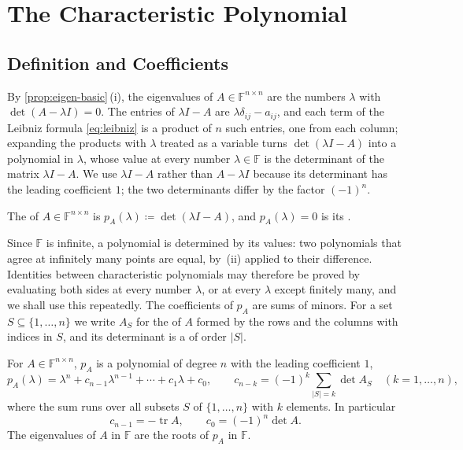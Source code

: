 \section{The Characteristic Polynomial}
\label{sec:characteristic-polynomial}

\subsection{Definition and Coefficients}

By \cref{prop:eigen-basic}\,(i), the eigenvalues of $A\in\mathbb F^{n\times n}$ are the numbers $\lambda$ with $\det(A-\lambda I)=0$. The entries of $\lambda I-A$ are $\lambda\delta_{ij}-a_{ij}$, and each term of the Leibniz formula \eqref{eq:leibniz} is a product of $n$ such entries, one from each column; expanding the products with $\lambda$ treated as a variable turns $\det(\lambda I-A)$ into a polynomial in $\lambda$, whose value at every number $\lambda\in\mathbb F$ is the determinant of the matrix $\lambda I-A$. We use $\lambda I-A$ rather than $A-\lambda I$ because its determinant has the leading coefficient $1$; the two determinants differ by the factor $(-1)^n$.

\begin{definition}
\label{def:characteristic-polynomial}
The  of $A\in\mathbb F^{n\times n}$ is $p_A(\lambda)\coloneqq\det(\lambda I-A)$, and $p_A(\lambda)=0$ is its .
\end{definition}

Since $\mathbb F$ is infinite, a polynomial is determined by its values: two polynomials that agree at infinitely many points are equal, by \,(ii) applied to their difference. Identities between characteristic polynomials may therefore be proved by evaluating both sides at every number $\lambda$, or at every $\lambda$ except finitely many, and we shall use this repeatedly. The coefficients of $p_A$ are sums of minors. For a set $S\subseteq\{1,\ldots,n\}$ we write $A_S$ for the  of $A$ formed by the rows and the columns with indices in $S$, and its determinant is a  of order $|S|$.

\begin{theorem}
\label{thm:charpoly-coefficients}
For $A\in\mathbb F^{n\times n}$, $p_A$ is a polynomial of degree $n$ with the leading coefficient $1$,
\[
p_A(\lambda)=\lambda^n+c_{n-1}\lambda^{n-1}+\cdots+c_1\lambda+c_0,\qquad c_{n-k}=(-1)^k\sum_{|S|=k}\det A_S\quad(k=1,\ldots,n),
\]
where the sum runs over all subsets $S$ of $\{1,\ldots,n\}$ with $k$ elements. In particular
\[
c_{n-1}=-\operatorname{tr}A,\qquad c_0=(-1)^n\det A .
\]
The eigenvalues of $A$ in $\mathbb F$ are the roots of $p_A$ in $\mathbb F$.
\end{theorem}

